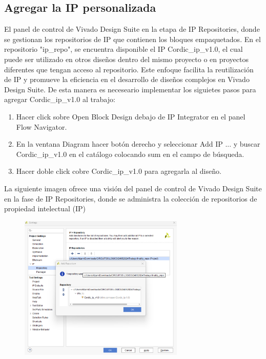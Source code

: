 \documentclass[12pt,a4paper, twoside]{article} %
\begin{document}
\subsection{Agregar la IP personalizada}


El panel de control de Vivado Design Suite en la etapa de IP Repositories, donde se gestionan los repositorios de IP que contienen los bloques empaquetados. En el repositorio "ip\_repo", se encuentra disponible el IP Cordic\_ip\_v1.0, el cual puede ser utilizado en otros diseños dentro del mismo proyecto o en proyectos diferentes que tengan acceso al repositorio. Este enfoque facilita la reutilización de IP y promueve la eficiencia en el desarrollo de diseños complejos en Vivado Design Suite. De esta manera es neceseario implementar los siguietes pasos para agregar Cordic\_ip\_v1.0 al trabajo:

\begin{enumerate}
    \item Hacer click sobre Open Block Design debajo de IP Integrator en el panel Flow Navigator.
    \item En la ventana Diagram hacer botón derecho y seleccionar Add IP ... y buscar Cordic\_ip\_v1.0 en el catálogo colocando sum en el campo de búsqueda.
    \item Hacer doble click cobre Cordic\_ip\_v1.0 para agregarla al diseño.
\end{enumerate}

La siguiente imagen ofrece una visión del panel de control de Vivado Design Suite en la fase de IP Repositories, donde se administra la colección de repositorios de propiedad intelectual (IP)

\begin{figure}[ht]
\centering
\includegraphics[width=0.7\textwidth]{./Figuras/extracción_ip.png}
\label{fig:Flujo de trabajo creación IP}
\end{figure}
\end{document}
